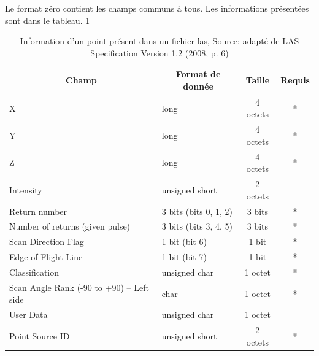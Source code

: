 Le format zéro contient les champs communs à tous. Les informations présentées sont dans le tableau. \ref{tab:las_point_data}
\begin{table}[htbp!]
\centering
\begin{tabular}{|l|l|c|c|}
\hline
\multicolumn{1}{|c|}{\textbf{Champ}}     & \multicolumn{1}{c|}{\textbf{Format de donnée}} & \textbf{Taille} & \textbf{Requis} \\ \hline
X                                        & long                                           & 4 octets        & *               \\ \hline
Y                                        & long                                           & 4 octets        & *               \\ \hline
Z                                        & long                                           & 4 octets        & *               \\ \hline
Intensity                                & unsigned short                                 & 2 octets        &                 \\ \hline
Return number                            & 3 bits (bits 0, 1, 2)                          & 3 bits          & *               \\ \hline
Number of returns (given pulse)          & 3 bits (bits 3, 4, 5)                          & 3 bits          & *               \\ \hline
Scan Direction Flag                      & 1 bit (bit 6)                                  & 1 bit           & *               \\ \hline
Edge of Flight Line                      & 1 bit (bit 7)                                  & 1 bit           & *               \\ \hline
Classification                           & unsigned char                                  & 1 octet         & *               \\ \hline
Scan Angle Rank (-90 to +90) – Left side & char                                           & 1 octet         & *               \\ \hline
User Data                                & unsigned char                                  & 1 octet         &                 \\ \hline
Point Source ID                          & unsigned short                                 & 2 octets        & *               \\ \hline
\end{tabular}
\caption{
Information d'un point présent dans un fichier \gls{las},
Source: adapté de LAS Specification Version 1.2 (2008, p. 6)}
\label{tab:las_point_data}
\end{table}

